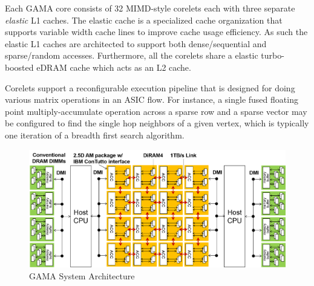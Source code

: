 Each GAMA core consists of 32 MIMD-style corelets each with three separate \emph{elastic} L1 caches. The elastic cache is a specialized cache organization that supports variable width cache lines to improve cache usage efficiency.  As such the elastic L1 caches are architected to support both dense/sequential and sparse/random accesses.
Furthermore,  all the corelets share a elastic turbo-boosted eDRAM cache which acts as an L2 cache. 

Corelets support a reconfigurable execution pipeline that is designed for doing various matrix operations in an ASIC flow. For instance, a single fused floating point multiply-accumulate operation across a sparse row and a sparse vector may be configured to find the single hop neighbors of a given vertex, which is typically one iteration of a breadth first search algorithm. %

\begin{figure}
\center
\includegraphics[width=1.0\linewidth]{fig/arch.png}
\caption{GAMA System Architecture}
\label{fig:arch}
\end{figure}
 


